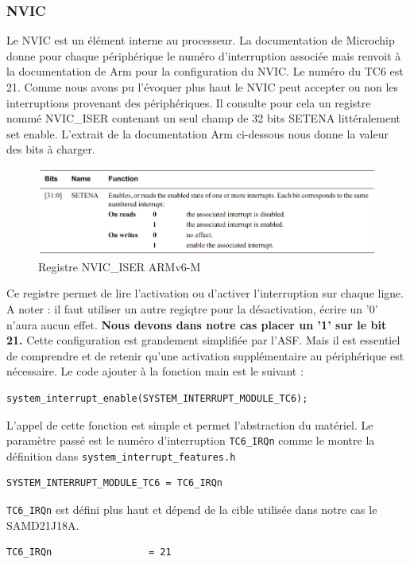 \documentclass[a4paper]{article}
\begin{document}
	\subsubsection{NVIC}
	Le NVIC est un élément interne au processeur. La documentation de Microchip donne pour chaque périphérique le numéro d'interruption associée mais renvoit à la documentation de Arm pour la configuration du NVIC. Le numéro du TC6 est 21. Comme nous avons pu l'évoquer plus haut le NVIC peut accepter ou non les interruptions provenant des périphériques. Il consulte pour cela un registre nommé NVIC\_ISER contenant un seul champ de 32 bits SETENA littéralement set enable. L'extrait de la documentation \cite{ARMv6} Arm ci-dessous nous donne la valeur des bits à charger.
	\begin{figure}[H]
		\centering
		\includegraphics[width=0.8\linewidth]{ISER}
		\caption{Registre NVIC\_ISER ARMv6-M}
		\label{fig:ISER}
	\end{figure}
	Ce registre permet de lire l'activation ou d'activer l'interruption sur chaque ligne. A noter : il faut utiliser un autre regiqtre pour la désactivation, écrire un '0' n'aura aucun effet. \textbf{Nous devons dans notre cas placer un '1' sur le bit 21.} Cette configuration est grandement simplifiée par l'ASF. Mais il est essentiel de comprendre et de retenir qu'une activation supplémentaire au périphérique est nécessaire. Le code ajouter à la fonction main est le suivant :
	\begin{lstlisting}[style=CStyle]
		system_interrupt_enable(SYSTEM_INTERRUPT_MODULE_TC6);\end{lstlisting}
	L'appel de cette fonction est simple et permet l'abstraction du matériel. Le paramètre passé est le numéro d'interruption \texttt{TC6\_IRQn} comme le montre la définition dans \texttt{system\_interrupt\_features.h}
	\begin{lstlisting}[style=CStyle]
	SYSTEM_INTERRUPT_MODULE_TC6 = TC6_IRQn\end{lstlisting}
	\texttt{TC6\_IRQn} est défini plus haut et dépend de la cible utilisée dans notre cas le SAMD21J18A. 
	\begin{lstlisting}[style=CStyle]
	 TC6_IRQn                 = 21 \end{lstlisting}
\end{document}
